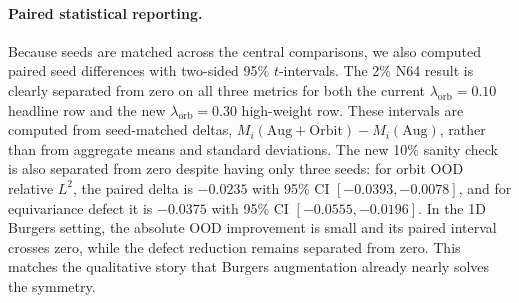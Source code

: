 \paragraph{Paired statistical reporting.} Because seeds are matched across the central comparisons, we also computed paired seed differences with two-sided 95\% \(t\)-intervals. The 2\% N64 result is clearly separated from zero on all three metrics for both the current \(\lambda_{\mathrm{orb}}=0.10\) headline row and the new \(\lambda_{\mathrm{orb}}=0.30\) high-weight row. These intervals are computed from seed-matched deltas, \(M_i(\mathrm{Aug+Orbit})-M_i(\mathrm{Aug})\), rather than from aggregate means and standard deviations. The new 10\% sanity check is also separated from zero despite having only three seeds: for orbit OOD relative \(L^2\), the paired delta is \(-0.0235\) with 95\% CI \([-0.0393,-0.0078]\), and for equivariance defect it is \(-0.0375\) with 95\% CI \([-0.0555,-0.0196]\). In the 1D Burgers setting, the absolute OOD improvement is small and its paired interval crosses zero, while the defect reduction remains separated from zero. This matches the qualitative story that Burgers augmentation already nearly solves the symmetry.

